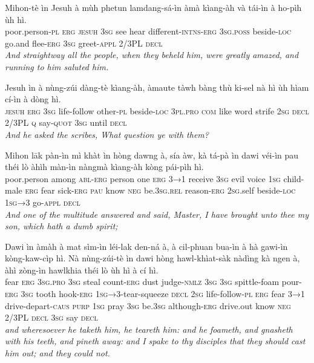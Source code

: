 \documentclass[11pt,a4paper]{article}
\begin{document}
\begin{exe}
\gll Mihon-tè ìn Jesuh à mùh phetun lamdang-sá-ìn àmà kìang-àh và tái-ìn à ho-pìh ùh hì. \\
     poor.person-\textsc{pl} \textsc{erg} \textsc{jesuh} \textsc{3sg} see hear different-\textsc{intns}-\textsc{erg} \textsc{3sg}.\textsc{poss} beside-\textsc{loc} go.and flee-\textsc{erg} \textsc{3sg} greet-\textsc{appl} 2/3PL \textsc{decl} \\
\glt \textcolor{kjvcolor}{\textit{And straightway all the people, when they beheld him, were greatly amazed, and running to him saluted him.}}

\gll Jesuh ìn à nùng-zúi dàng-tè kìang-àh, àmaute tàwh bàng thù ki-sel nà hì ùh hìam cí-ìn à dòng hì. \\
     \textsc{jesuh} \textsc{erg} \textsc{3sg} life-follow other-\textsc{pl} beside-\textsc{loc} \textsc{3pl}.\textsc{pro} \textsc{com} like word strife \textsc{2sg} \textsc{decl} 2/3PL \textsc{q} say-\textsc{quot} \textsc{3sg} until \textsc{decl} \\
\glt \textcolor{kjvcolor}{\textit{And he asked the scribes, What question ye with them?}}

\gll Mihon lāk pàn-ìn mì khàt ìn hòng dawng à, sía àw, kà tá-pà ìn dawi véi-ìn pau théi lò àhìh màn-ìn nàngmà kìang-àh kòng pái-pìh hì. \\
     poor.person among \textsc{abl}-\textsc{erg} person one \textsc{erg} \textsc{3→1} receive \textsc{3sg} evil voice \textsc{1sg} child-male \textsc{erg} fear sick-\textsc{erg} \textsc{pau} know \textsc{neg} be.\textsc{3sg}.\textsc{rel} reason-\textsc{erg} \textsc{2sg}.self beside-\textsc{loc} \textsc{1sg→3} go-\textsc{appl} \textsc{decl} \\
\glt \textcolor{kjvcolor}{\textit{And one of the multitude answered and said, Master, I have brought unto thee my son, which hath a dumb spirit;}}

\gll Dawi ìn àmàh à mat sìm-ìn léi-lak den-ná à, à cil-phuan bua-ìn à hà gawi-ìn kòng-kaw-cìp hì. Nà nùng-zúi-tè ìn dawi hòng hawl-khìat-sàk nàdìng kà ngen à, àhì zòng-ìn hawlkhia théi lò ùh hì à cí hì. \\
     fear \textsc{erg} \textsc{3sg}.\textsc{pro} \textsc{3sg} steal count-\textsc{erg} dust judge-\textsc{nmlz} \textsc{3sg} \textsc{3sg} spittle-foam pour-\textsc{erg} \textsc{3sg} tooth hook-\textsc{erg} \textsc{1sg→3}-tear-squeeze \textsc{decl} \textsc{2sg} life-follow-\textsc{pl} \textsc{erg} fear \textsc{3→1} drive-depart-\textsc{caus} \textsc{purp} \textsc{1sg} pray \textsc{3sg} be.\textsc{3sg} although-\textsc{erg} drive.out know \textsc{neg} 2/3PL \textsc{decl} \textsc{3sg} say \textsc{decl} \\
\glt \textcolor{kjvcolor}{\textit{and wheresoever he taketh him, he teareth him: and he foameth, and gnasheth with his teeth, and pineth away: and I spake to thy disciples that they should cast him out; and they could not.}}


\end{exe}
\end{document}
